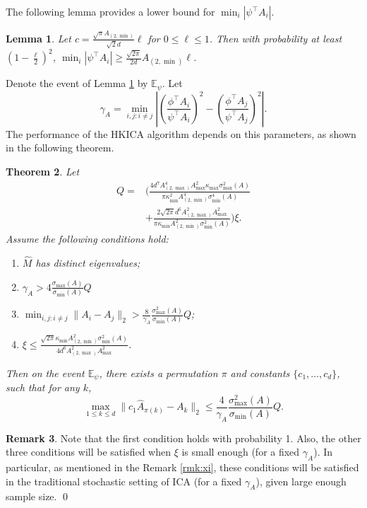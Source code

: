 \documentclass[twoside]{article}
\newcommand{\Epsi}{\mathbb{E}_{\psi}}
\newtheorem{lemma}{Lemma}[section]
\newtheorem{thm}[lemma]{Theorem}
\theoremstyle{definition}
\newtheorem{remark}[lemma]{Remark}
\begin{document}
The following lemma provides a lower bound for $\min_i |\psi^{\top}A_i|$.
\begin{lemma}
\label{lem:dmin}
Let $c = \frac{\sqrt{\pi}A_{(2,\min)}}{\sqrt{2}d} \ell$ for $0\le \ell \le 1$. Then with probability at least $(1-\frac{\ell}{2})^2$, 
$\min_i |\psi^{\top}A_i| \ge \frac{\sqrt{2\pi}}{2d}A_{(2,\min)}\ell$. 
\end{lemma}
Denote the event of Lemma \ref{lem:dmin} by $\Epsi$.
Let 
\begin{equation}
\label{def:kappa}
\gamma_A =  \min_{i,j: i\neq j} \left\vert \left(\frac{\phi^{\top}A_i}{\psi^{\top}A_i}\right)^2 - \left(\frac{\phi^{\top}A_j}{\psi^{\top}A_j}\right)^2 \right\vert. 
\end{equation}
The performance of the HKICA algorithm depends on this parameters, as shown in the following theorem.
\begin{thm}
 \label{thm:efficiency}
Let 
 \begin{align*}
 Q = &\Big(\frac{4d^7A_{(2,\max)}^4A_{\max}^2\kappa_{\max}\sigma_{\max}^2(A) }{\pi\kappa^2_{\min}A^4_{(2,\min)}\sigma_{\min}^4(A)} \\
 & + \frac{2\sqrt{2\pi}d^6A_{(2,\max)}^2A_{\max}^2}{\pi\kappa_{\min}A^2_{(2,\min)}\sigma_{\min}^2(A)} \Big)
  \xi.
 \end{align*}
 Assume the following conditions hold:
 \begin{enumerate}
 \vspace{-3mm}
 \item $\widehat{M}$ has distinct eigenvalues;
 \item $\gamma_A > 4\frac{\sigma_{\max}(A)}{\sigma_{\min}(A)} Q$
 \item $\min_{i,j:i\neq j} \|A_i - A_j\|_2 > \frac{8}{\gamma_A}\frac{\sigma_{\max}^2(A)}{\sigma_{\min}(A) } Q$;
 \item $\xi \le \frac{\sqrt{2\pi}\kappa_{\min}A^2_{(2,\min)}\sigma_{\min}^2(A)}{4d^6 A_{(2,\max)}^2A_{\max}^2}$.
  \end{enumerate}
 Then on the event $\Epsi$, there exists a permutation $\pi$ and constants $\{c_1,\ldots,c_d\}$, such that for any $k$,
 \[
  \max_{1\le k\le d}\| c_1\widehat{A}_{\pi(k)} - A_k\|_2 \le \frac{4}{\gamma_A} \frac{\sigma_{\max}^2(A)}{ \sigma_{\min}(A)}Q.
  \]
 \end{thm}
\begin{remark}
Note that the first condition holds with probability 1. Also, the other three conditions will be satisfied when $\xi$ is small enough (for a fixed $\gamma_A$).
In particular, as mentioned in the Remark \ref{rmk:xi}, these conditions will be satisfied in the traditional stochastic setting of ICA (for a fixed $\gamma_A$), given large enough sample size. \qed
\end{remark}
\end{document}
